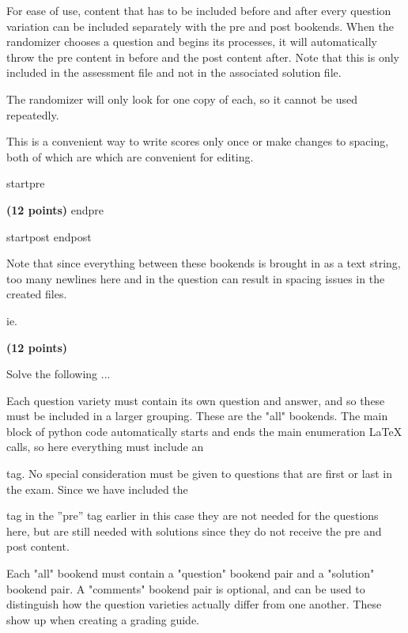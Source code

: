 


For ease of use, content that has to be included before and after every question variation can be included separately with the pre and post bookends. When the randomizer chooses a question and begins its processes, it will automatically throw the pre content in before and the post content after. Note that this is only included in the assessment file and not in the associated solution file.

The randomizer will only look for one copy of each, so it cannot be used repeatedly.

This is a convenient way to write scores only once or make changes to spacing, both of which are which are convenient for editing. 

startpre \item {\bf (12 points)} endpre

startpost
\vfill 
endpost

Note that since everything between these bookends is brought in as a text string, too many newlines here and in the question can result in spacing issues in the created files. 

ie. \item {\bf (12 points)} 

Solve the following ... 




Each question variety must contain its own question and answer, and so these must be included in a larger grouping. These are the "all" bookends. The main block of python code automatically starts and ends the main enumeration LaTeX calls, so here everything must include an \item tag. No special consideration must be given to questions that are first or last in the exam. Since we have included the \item tag in the ''pre'' tag earlier in this case they are not needed  for the questions here, but are still needed with solutions since they do not receive the pre and post content.

Each "all" bookend must contain a "question" bookend pair and a  "solution" bookend pair. A "comments" bookend pair is optional, and can be used to distinguish how the question varieties actually differ from one another. These show up when creating a grading guide.

